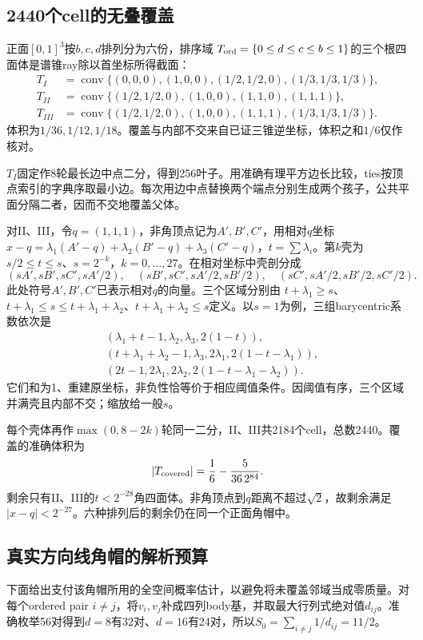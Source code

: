 \documentclass[UTF8,11pt,a4paper,fontset=fandol]{ctexart}
\theoremstyle{remark}\newtheorem{remark}[theorem]{注}
\newcommand{\1}{\mathbf1}\newcommand{\pos}[1]{(#1)_+}
\DeclareMathOperator{\conv}{conv}\DeclareMathOperator{\Dom}{Dom}
\begin{document}
\subsection{2440个cell的无叠覆盖}
正面$[0,1]^3$按$b,c,d$排列分为六份，排序域
$T_{\rm ord}=\{0\le d\le c\le b\le1\}$的三个根四面体是谱锥ray除以首坐标所得截面：
\begin{align*}
 T_I&=\conv\{(0,0,0),(1,0,0),(1/2,1/2,0),(1/3,1/3,1/3)\},\\
 T_{II}&=\conv\{(1/2,1/2,0),(1,0,0),(1,1,0),(1,1,1)\},\\
 T_{III}&=\conv\{(1/2,1/2,0),(1,0,0),(1,1,1),(1/3,1/3,1/3)\}.
\end{align*}
体积为$1/36,1/12,1/18$。覆盖与内部不交来自已证三锥逆坐标，体积之和$1/6$仅作核对。

$T_I$固定作8轮最长边中点二分，得到256叶子。用准确有理平方边长比较，ties按顶点索引的字典序取最小边。每次用边中点替换两个端点分别生成两个孩子，公共平面分隔二者，因而不交地覆盖父体。

对II、III，令$q=(1,1,1)$，非角顶点记为$A',B',C'$，用相对$q$坐标$x-q=\lambda_1(A'-q)+\lambda_2(B'-q)+\lambda_3(C'-q)$，$t=\sum\lambda_i$。第$k$壳为$s/2\le t\le s$、$s=2^{-k}$，$k=0,\ldots,27$。在相对坐标中壳剖分成
\[
 (sA',sB',sC',sA'/2),\quad
 (sB',sC',sA'/2,sB'/2),\quad
 (sC',sA'/2,sB'/2,sC'/2).
\]
此处符号$A',B',C'$已表示相对$q$的向量。三个区域分别由
$t+\lambda_1\ge s$、$t+\lambda_1\le s\le t+\lambda_1+\lambda_2$、$t+\lambda_1+\lambda_2\le s$定义。以$s=1$为例，三组barycentric系数依次是
\begin{align*}
 &(\lambda_1+t-1,\lambda_2,\lambda_3,2(1-t)),\\
 &(t+\lambda_1+\lambda_2-1,\lambda_3,2\lambda_1,2(1-t-\lambda_1)),\\
 &(2t-1,2\lambda_1,2\lambda_2,2(1-t-\lambda_1-\lambda_2)).
\end{align*}
它们和为1、重建原坐标，非负性恰等价于相应阈值条件。因阈值有序，三个区域并满壳且内部不交；缩放给一般$s$。

每个壳体再作$\max(0,8-2k)$轮同一二分，II、III共2184个cell，总数2440。覆盖的准确体积为
\[
 |T_{\rm covered}|=\frac16-\frac5{36\,2^{84}}.
\]
剩余只有II、III的$t<2^{-28}$角四面体。非角顶点到$q$距离不超过$\sqrt2$，故剩余满足$|x-q|<2^{-27}$。六种排列后的剩余仍在同一个正面角帽中。

\subsection{真实方向线角帽的解析预算}
下面给出支付该角帽所用的全空间概率估计，以避免将未覆盖邻域当成零质量。对每个ordered pair $i\ne j$，将$v_i,v_j$补成四列body基，并取最大行列式绝对值$d_{ij}$。准确枚举56对得到$d=8$有32对、$d=16$有24对，所以$S_0=\sum_{i\ne j}1/d_{ij}=11/2$。
\end{document}
